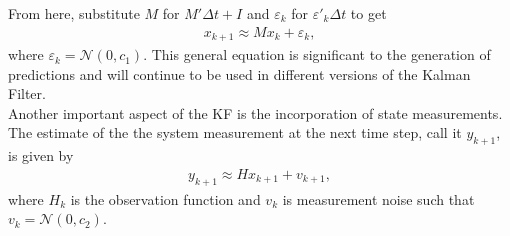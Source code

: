\noindent From here, substitute $M$ for $M' \Delta t + I$ and $\varepsilon_k$ for  $\varepsilon '_k  \Delta t $ to get
\begin{align*}
	x_{k+1} \approx M x_k + \varepsilon_k,
\end{align*}
\noindent where $\varepsilon_k = \mathcal{N}(0, c_1)$. This general equation is significant to the generation of predictions and will continue to be used in different versions of the Kalman Filter. \\ 

\noindent Another important aspect of the KF is the incorporation of state measurements. The estimate of the the system measurement at the next time step, call it $y_{k+1}$, is given by 
\begin{align*}
	y_{k+1} \approx H x_{k+1} + v_{k+1},
\end{align*}
where $H_k$ is the observation function and $v_k$ is measurement noise such that $v_k = \mathcal{N}(0, c_2)$. \\


